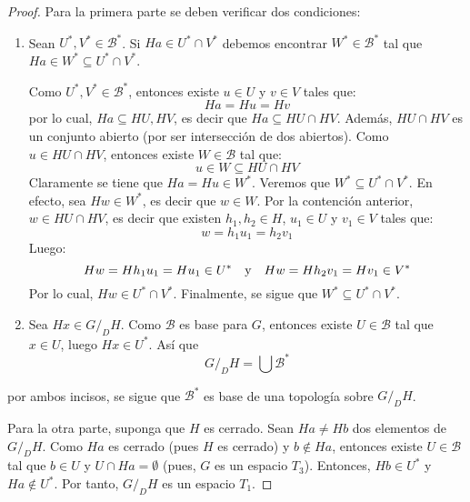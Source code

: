 \documentclass[12pt]{report}
\theoremstyle{largebreak}
\begin{document}
    \begin{proof}
        Para la primera parte se deben verificar dos condiciones:
        \begin{enumerate}
            \item Sean $U^*,V^*\in\mathcal{B}^*$. Si $Ha\in U^*\cap V^*$ debemos encontrar $W^*\in\mathcal{B}^*$ tal que $Ha\in W^*\subseteq U^*\cap V^*$.
            
            Como $U^*,V^*\in\mathcal{B}^*$, entonces existe $u\in U$ y $v\in V$ tales que:
            \begin{equation*}
                Ha=Hu=Hv
            \end{equation*}
            por lo cual, $Ha\subseteq HU,HV$, es decir que $Ha\subseteq HU\cap HV$. Además, $HU\cap HV$ es un conjunto abierto (por ser intersección de dos abiertos). Como $u\in HU\cap HV$, entonces existe $W\in\mathcal{B}$ tal que:
            \begin{equation*}
                u\in W\subseteq HU\cap HV
            \end{equation*}
            Claramente se tiene que $Ha=Hu\in W^*$. Veremos que $W^*\subseteq U^*\cap V^*$. En efecto, sea $Hw\in W^*$, es decir que $w\in W$. Por la contención anterior, $w\in HU\cap HV$, es decir que existen $h_1,h_2\in H$, $u_1\in U$ y $v_1\in V$ tales que:
            \begin{equation*}
                w=h_1u_1=h_2v_1
            \end{equation*}
            Luego:
            \begin{equation*}
                Hw=Hh_1u_1=Hu_1\in U^*\quad\textup{y}\quad Hw=Hh_2v_1=Hv_1\in V^*
            \end{equation*}
            Por lo cual, $Hw\in U^*\cap V^*$. Finalmente, se sigue que $W^*\subseteq U^*\cap V^*$.

            \item Sea $Hx\in G/_DH$. Como $\mathcal{B}$ es base para $G$, entonces existe $U\in\mathcal{B}$ tal que $x\in U$, luego $Hx\in U^*$. Así que
            \begin{equation*}
                G/_DH=\bigcup\mathcal{B}^*
            \end{equation*}
        \end{enumerate}
        por ambos incisos, se sigue que $\mathcal{B}^*$ es base de una topología sobre $G/_DH$.

        Para la otra parte, suponga que $H$ es cerrado. Sean $Ha\neq Hb$ dos elementos de $G/_DH$. Como $Ha$ es cerrado (pues $H$ es cerrado) y $b\notin Ha$, entonces existe $U\in\mathcal{B}$ tal que $b\in U$ y $U\cap Ha=\emptyset$ (pues, $G$ es un espacio $T_3$). Entonces, $Hb\in U^*$ y $Ha\notin U^*$. Por tanto, $G/_DH$ es un espacio $T_1$.
    \end{proof}
\end{document}
